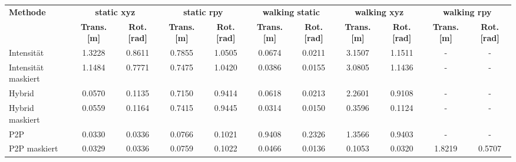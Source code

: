\begin{tabular}{l*{10}{c}}
\toprule
    \multirow{2}{*}{\textbf{Methode}} & \multicolumn{2}{c}{\textbf{static xyz}} & \multicolumn{2}{c}{\textbf{static rpy}} & \multicolumn{2}{c}{\textbf{walking static}} & \multicolumn{2}{c}{\textbf{walking xyz}} & \multicolumn{2}{c}{\textbf{walking rpy}} \\
\cmidrule(lr){2-3}  \cmidrule(lr){4-5}  \cmidrule(lr){6-7}  \cmidrule(lr){8-9}  \cmidrule(lr){10-11}
    & \textbf{Trans. [m]} & \textbf{Rot. [rad]} & \textbf{Trans. [m]} & \textbf{Rot. [rad]} & \textbf{Trans. [m]} & \textbf{Rot. [rad]} & \textbf{Trans. [m]} & \textbf{Rot. [rad]} & \textbf{Trans. [m]} & \textbf{Rot. [rad]} \\
\midrule
Intensität  & 1.3228 & 0.8611 & 0.7855 & 1.0505 & 0.0674 & 0.0211 & 3.1507 & 1.1511 & - & - \\
Intensität maskiert & 1.1484 & 0.7771 & 0.7475 & 1.0420 & 0.0386 & 0.0155 & 3.0805 & 1.1436 & - & - \\
Hybrid  & 0.0570 & 0.1135 & 0.7150 & 0.9414 & 0.0618 & 0.0213 & 2.2601 & 0.9108 & - & - \\
Hybrid maskiert & 0.0559 & 0.1164 & 0.7415 & 0.9445 & 0.0314 & 0.0150 & 0.3596 & 0.1124 & - & - \\
P2P  & 0.0330 & 0.0336 & 0.0766 & 0.1021 & 0.9408 & 0.2326 & 1.3566 & 0.9403 & - & - \\
P2P maskiert & 0.0329 & 0.0336 & 0.0759 & 0.1022 & 0.0466 & 0.0136 & 0.1053 & 0.0320 & 1.8219 & 0.5707 \\
\bottomrule
\end{tabular}
